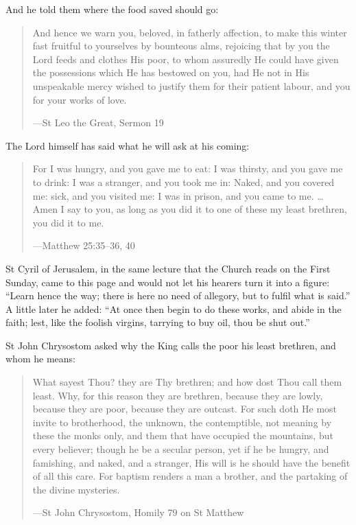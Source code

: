 \noindent And he told them where the food saved should go:

\begin{quote}
And hence we warn you, beloved, in fatherly affection, to make this winter fast
fruitful to yourselves by bounteous alms, rejoicing that by you the Lord feeds
and clothes His poor, to whom assuredly He could have given the possessions
which He has bestowed on you, had He not in His unspeakable mercy wished to
justify them for their patient labour, and you for your works of love.\par
{\smallskip\noindent\small ---St Leo the Great, Sermon 19\par}
\end{quote}

The Lord himself has said what he will ask at his coming:

\begin{quote}
For I was hungry, and you gave me to eat: I was thirsty, and you gave me to
drink: I was a stranger, and you took me in: Naked, and you covered me: sick,
and you visited me: I was in prison, and you came to me. \ldots{} Amen I say to
you, as long as you did it to one of these my least brethren, you did it to
me.\par
{\smallskip\noindent\small ---Matthew 25:35--36, 40\par}
\end{quote}

\noindent St Cyril of Jerusalem, in the same lecture that the Church reads on
the First Sunday, came to this page and would not let his hearers turn it into
a figure: ``Learn hence the way; there is here no need of allegory, but to
fulfil what is said.'' A little later he added: ``At once then begin to do these
works, and abide in the faith; lest, like the foolish virgins, tarrying to buy
oil, thou be shut out.''

St John Chrysostom asked why the King calls the poor his least brethren, and
whom he means:

\begin{quote}
What sayest Thou? they are Thy brethren; and how dost Thou call them least. Why,
for this reason they are brethren, because they are lowly, because they are
poor, because they are outcast. For such doth He most invite to brotherhood, the
unknown, the contemptible, not meaning by these the monks only, and them that
have occupied the mountains, but every believer; though he be a secular person,
yet if he be hungry, and famishing, and naked, and a stranger, His will is he
should have the benefit of all this care. For baptism renders a man a brother,
and the partaking of the divine mysteries.\par
{\smallskip\noindent\small ---St John Chrysostom, Homily 79 on St Matthew\par}
\end{quote}

